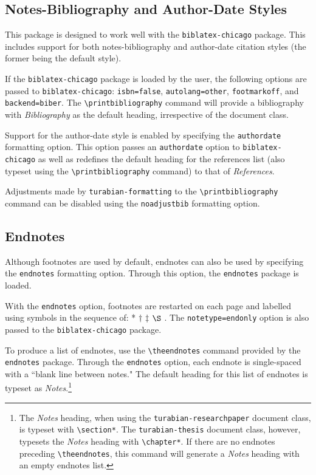 \documentclass{article}
\newcommand{\textcmd}[1]{\texttt{\textbackslash #1}}
\begin{document}
\subsection{Notes-Bibliography and Author-Date Styles}

This package is designed to work well with the \texttt{biblatex-chicago} package. This includes support for both notes-bibliography and author-date citation styles (the former being the default style).

If the \texttt{biblatex-chicago} package is loaded by the user, the following options are passed to \texttt{biblatex-chicago}: \texttt{isbn=false}, \texttt{autolang=other}, \texttt{footmarkoff}, and \texttt{backend=biber}. The \textcmd{printbibliography} command will provide a bibliography with \emph{Bibliography} as the default heading, irrespective of the document class.

%
Support for the author-date style is enabled by specifying the \texttt{authordate} formatting option. This option passes an \texttt{authordate} option to \texttt{biblatex-chicago} as well as redefines the default heading for the references list (also typeset using the \textcmd{printbibliography} command) to that of \emph{References}.

%
Adjustments made by \texttt{turabian-formatting} to the \textcmd{printbibliography} command can be disabled using the \texttt{noadjustbib} formatting option.

\subsection{Endnotes}

%
Although footnotes are used by default, endnotes can also be used by specifying the \texttt{endnotes} formatting option. Through this option, the \texttt{endnotes} package is loaded.

With the \texttt{endnotes} option, footnotes are restarted on each page and labelled using symbols in the sequence of: * $\dagger$ $\ddagger$ $\S$ \autocite[156]{turabian_manual_2013}. The \texttt{notetype=endonly} option is also passed to the \texttt{biblatex-chicago} package.

To produce a list of endnotes, use the \textcmd{theendnotes} command provided by the \texttt{endnotes} package. Through the \texttt{endnotes} option, each endnote is single-spaced with a ``blank line between notes." The default heading for this list of endnotes is typeset as \emph{Notes}.\footnote{%
	The \emph{Notes} heading, when using the \texttt{turabian-researchpaper} document class, is typeset with \textcmd{section*}. The \texttt{turabian-thesis} document class, however, typesets the \emph{Notes} heading with \textcmd{chapter*}. If there are no endnotes preceding \textcmd{theendnotes}, this command will generate a \emph{Notes} heading with an empty endnotes list.}
\end{document}

